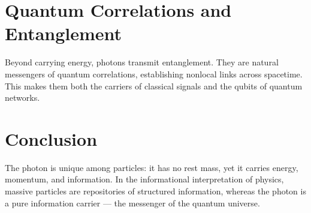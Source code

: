 \documentclass[12pt]{article}
\begin{document}
\section{Quantum Correlations and Entanglement}
Beyond carrying energy, photons transmit entanglement.
They are natural messengers of quantum correlations, 
establishing nonlocal links across spacetime. 
This makes them both the carriers of classical signals 
and the qubits of quantum networks.

\section{Conclusion}
The photon is unique among particles: it has no rest mass, yet it carries 
energy, momentum, and information. 
In the informational interpretation of physics, massive particles 
are repositories of structured information, whereas the photon is a 
pure information carrier --- the messenger of the quantum universe.
\end{document}
